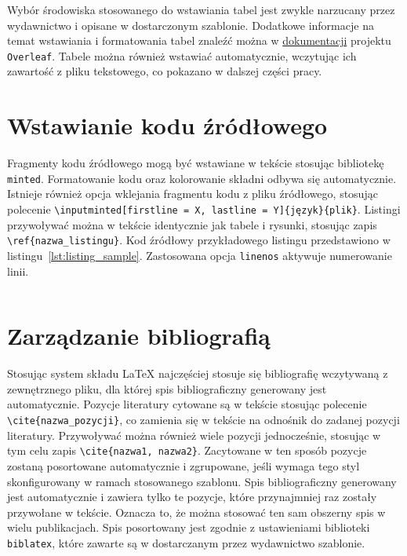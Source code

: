 Wybór środowiska stosowanego do wstawiania tabel jest zwykle narzucany przez wydawnictwo i opisane w dostarczonym szablonie. Dodatkowe informacje na temat wstawiania i formatowania tabel znaleźć można w \href{https://www.overleaf.com/learn/latex/Tables}{dokumentacji} projektu \texttt{Overleaf}. Tabele można również wstawiać automatycznie, wczytując ich zawartość z pliku tekstowego, co pokazano w dalszej części pracy.

\section{Wstawianie kodu źródłowego}

Fragmenty kodu źródłowego mogą być wstawiane w tekście stosując bibliotekę \texttt{minted}. Formatowanie kodu oraz kolorowanie składni odbywa się automatycznie. Istnieje również opcja wklejania fragmentu kodu z pliku źródłowego, stosując polecenie \verb|\inputminted[firstline = X, lastline = Y]{język}{plik}|. Listingi przywoływać można w tekście identycznie jak tabele i rysunki, stosując zapis \verb|\ref{nazwa_listingu}|. Kod źródłowy przykładowego listingu przedstawiono w listingu~\ref{lst:listing_sample}. Zastosowana opcja \texttt{linenos} aktywuje numerowanie linii.

\begin{listing}[htb]
\inputminted{latex}{skrypty/listing_sample.tex}
\end{listing}

\section{Zarządzanie bibliografią}

Stosując system składu \LaTeX{} najczęściej stosuje się bibliografię wczytywaną z zewnętrznego pliku, dla której spis bibliograficzny generowany jest automatycznie. Pozycje literatury cytowane są w tekście stosując polecenie \verb|\cite{nazwa_pozycji}|, co zamienia się w tekście na odnośnik do zadanej pozycji literatury. Przywoływać można również wiele pozycji jednocześnie, stosując w tym celu zapis \verb|\cite{nazwa1, nazwa2}|. Zacytowane w ten sposób pozycje zostaną posortowane automatycznie i zgrupowane, jeśli wymaga tego styl skonfigurowany w ramach stosowanego szablonu. Spis bibliograficzny generowany jest automatycznie i zawiera tylko te pozycje, które przynajmniej raz zostały przywołane w tekście. Oznacza to, że można stosować ten sam obszerny spis w wielu publikacjach. Spis posortowany jest zgodnie z ustawieniami biblioteki \texttt{biblatex}, które zawarte są w dostarczanym przez wydawnictwo szablonie.

